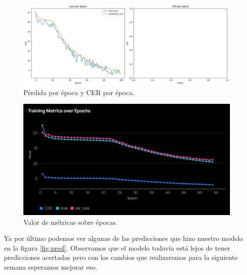 \documentclass[10pt]{article}
\begin{document}
	\begin{figure}[h]
		\centering
		\includegraphics[width=\linewidth]{./images/loss_per_epoch.jpg}
		\caption{Pérdida por época y CER por época.}
		\label{fig:loss}
	\end{figure}
	
	\begin{figure}[h]
		\centering
		\includegraphics[width=\linewidth]{./images/metrics_over_epoch.jpg}
		\caption{Valor de métricas sobre épocas.}
		\label{fig:metrics}
	\end{figure}
	
	Ya por último podemos ver algunas de las predicciones que hizo nuestro modelo en la figura \ref{fig:pred}. Observamos que el modelo todavía está lejos de tener predicciones acertadas pero con los cambios que realizaremos para la siguiente semana esperamos mejorar eso.
	
\end{document}
